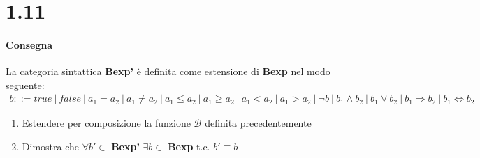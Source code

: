 \section{1.11}
\paragraph{Consegna} 
La categoria sintattica \textbf{Bexp'} è definita come estensione di \textbf{Bexp} nel modo seguente:
\begin{align*}
b ::= true \
| \ false \ 
| \ a_1 = a_2 \
| \ a_1 \not = a_2 \
| \ a_1 \leq a_2 \
| \ a_1 \geq a_2 \
| \ a_1 < a_2 \
| \ a_1 > a_2 \
| \ \lnot b \
| \ b_1 \land b_2 \
| \ b_1 \lor b_2 \
| \ b_1 \Rightarrow b_2 \
| \ b_1 \Leftrightarrow b_2    
\end{align*}
\begin{enumerate}
  \item Estendere per composizione la funzione $\mathcal{B}$ definita precedentemente
  \item Dimostra che $\forall b' \in$ \textbf{Bexp'} $\exists b \in$ \textbf{Bexp} t.c. $b' \equiv b$
\end{enumerate}

